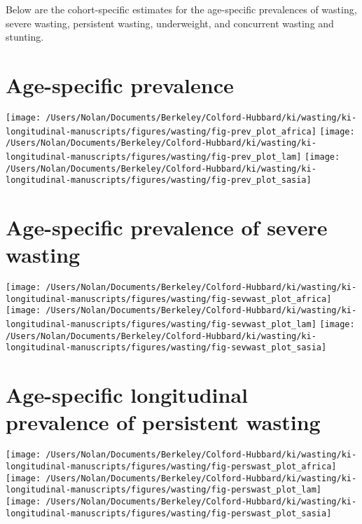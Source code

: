\documentclass[9pt,]{book}
\begin{document}
Below are the cohort-specific estimates for the age-specific prevalences
of wasting, severe wasting, persistent wasting, underweight, and
concurrent wasting and stunting.

\section{Age-specific prevalence}\label{age-specific-prevalence-1}

\texttt{[image: /Users/Nolan/Documents/Berkeley/Colford-Hubbard/ki/wasting/ki-longitudinal-manuscripts/figures/wasting/fig-prev\_plot\_africa]}
\texttt{[image: /Users/Nolan/Documents/Berkeley/Colford-Hubbard/ki/wasting/ki-longitudinal-manuscripts/figures/wasting/fig-prev\_plot\_lam]}
\texttt{[image: /Users/Nolan/Documents/Berkeley/Colford-Hubbard/ki/wasting/ki-longitudinal-manuscripts/figures/wasting/fig-prev\_plot\_sasia]}

\section{Age-specific prevalence of severe
wasting}\label{age-specific-prevalence-of-severe-wasting-1}

\texttt{[image: /Users/Nolan/Documents/Berkeley/Colford-Hubbard/ki/wasting/ki-longitudinal-manuscripts/figures/wasting/fig-sevwast\_plot\_africa]}
\texttt{[image: /Users/Nolan/Documents/Berkeley/Colford-Hubbard/ki/wasting/ki-longitudinal-manuscripts/figures/wasting/fig-sevwast\_plot\_lam]}
\texttt{[image: /Users/Nolan/Documents/Berkeley/Colford-Hubbard/ki/wasting/ki-longitudinal-manuscripts/figures/wasting/fig-sevwast\_plot\_sasia]}

\section{Age-specific longitudinal prevalence of persistent
wasting}\label{age-specific-longitudinal-prevalence-of-persistent-wasting-1}

\texttt{[image: /Users/Nolan/Documents/Berkeley/Colford-Hubbard/ki/wasting/ki-longitudinal-manuscripts/figures/wasting/fig-perswast\_plot\_africa]}
\texttt{[image: /Users/Nolan/Documents/Berkeley/Colford-Hubbard/ki/wasting/ki-longitudinal-manuscripts/figures/wasting/fig-perswast\_plot\_lam]}
\texttt{[image: /Users/Nolan/Documents/Berkeley/Colford-Hubbard/ki/wasting/ki-longitudinal-manuscripts/figures/wasting/fig-perswast\_plot\_sasia]}
\end{document}
